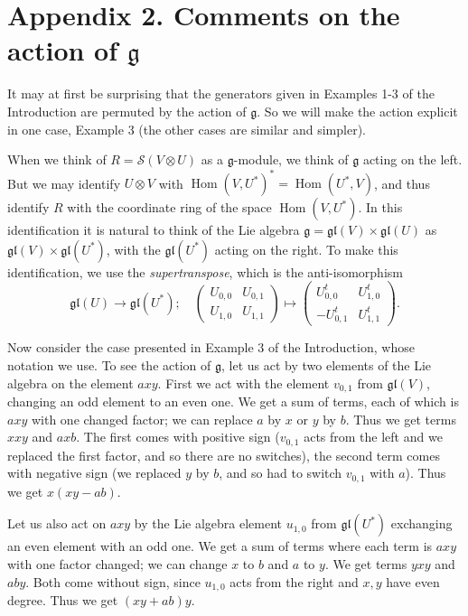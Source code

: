 \documentclass{tran-l}
\theoremstyle{plain}
\theoremstyle{remark}
\theoremstyle{definition}
\newcommand{\g}{{\mathfrak g}}
\newcommand{\gl}{{\mathfrak {gl}}}
\newcommand{\myS}{{\mathcal S}}
\begin{document}
\section*{Appendix 2. Comments on the action of $\mathfrak{g}$}

It may at first be surprising that the generators given in 
Examples 1-3 of the Introduction are permuted by the action of $\g $.
So we will make the action explicit in one case, Example 3 (the
other cases are similar and simpler). 

When we think of $R=\myS (V\otimes U)$ as a $\g $-module, we think of
$\g $ acting on the left. But we may identify $U\otimes V$
with $\operatorname{Hom}(V,U^{*})^{*}=\operatorname{Hom}(U^{*},V)$, and thus identify $R$ with the
coordinate ring of the space $\operatorname{Hom}(V,U^{*})$. In this identification
it is natural to think of the Lie algebra $\g =\gl (V)\times \gl (U)$
as $\gl (V)\times \gl (U^{*})$, with the $\gl (U^{*})$ acting on the right.
To make this identification, we use the {\em supertranspose\/}, which
is the anti-isomorphism 
\begin{equation*}
\gl (U)\to \gl (U^{*});\quad 
\left(
\begin{matrix}
U_{0,0}&U_{0,1}\\
U_{1,0}&U_{1,1}\end{matrix}
\right)
\mapsto
\left(\begin{matrix}
U_{0,0}^t&U_{1,0}^t\\
-U_{0,1}^t&U_{1,1}^t
\end{matrix}\right).
\end{equation*}

Now consider the case presented in Example 3 of the Introduction,  whose
notation we use. To see the action of $\g $, let us act by two elements of the
Lie algebra on the element $axy$. First we act with the element $v_{0,1}$ from
$\gl (V)$, changing an odd element to an even one. We get a sum of terms, each
of which is $axy$ with one changed factor; we can replace $a$ by $x$ or $y$ by
$b$. Thus we get terms $xxy$ and $axb$. The first comes with positive sign
($v_{0,1}$ acts from the left and we replaced the first factor, and so there
are no switches), the second term comes with negative sign (we replaced $y$ by
$b$, and so had to switch $v_{0,1}$ with $a$). Thus we get $x(xy-ab)$.

Let us also act on $axy$ by the Lie algebra element $u_{1,0}$ from $\gl
(U^{*})$ exchanging an even element with an odd one. We get a sum of terms
where each term is $axy$ with one factor changed; we can change $x$ to $b$ and
$a$ to $y$. We get terms $yxy$ and $aby$. Both come without sign, since
$u_{1,0}$ acts from the right and $x,y$ have even degree. Thus we get
$(xy+ab)y$. 
\end{document}
